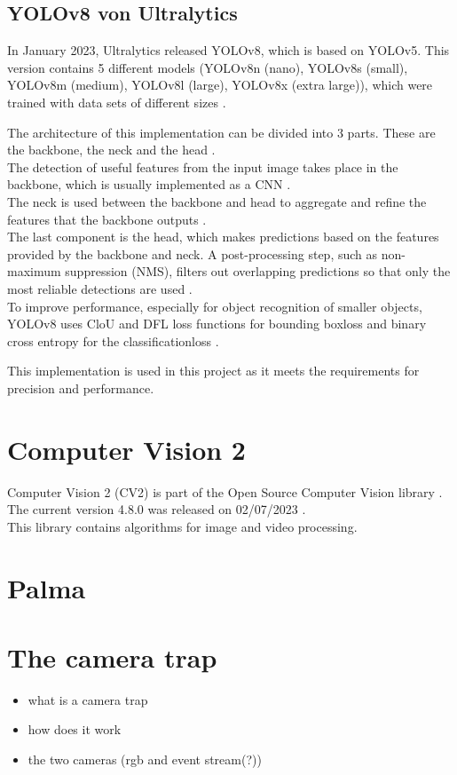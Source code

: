 	\subsection{YOLOv8 von Ultralytics}{ \label{subsec:YOLOv8_theoretic}
	
	In January 2023, Ultralytics released YOLOv8, which is based on YOLOv5. This version contains 5 different models (YOLOv8n (nano), YOLOv8s (small), YOLOv8m (medium), YOLOv8l (large), YOLOv8x (extra large)), which were trained with data sets of different sizes \citep{Terven2023}. 	

	The architecture of this implementation can be divided into 3 parts. These are the backbone, the neck and the head \citep{Terven2023}. \\
	The detection of useful features from the input image takes place in the backbone, which is usually implemented as a CNN \citep{Terven2023}. \\
	The neck is used between the backbone and head to aggregate and refine the features that the backbone outputs \citep{Terven2023}. \\
	The last component is the head, which makes predictions based on the features provided by the backbone and neck. A post-processing step, such as non-maximum suppression (NMS), filters out overlapping predictions so that only the most reliable detections are used \citep{Terven2023}.\\
	To improve performance, especially for object recognition of smaller objects, YOLOv8 uses CloU \citep{Zheng2020} and DFL \citep{Li2020} loss functions for bounding boxloss and binary cross entropy for the classificationloss \citep{Terven2023}. 

	This implementation is used in this project as it meets the requirements for precision and performance. 
	}


\section{Computer Vision 2}
		{ \label{subsec:Computer_Vision_2}
		Computer Vision 2 (CV2) is part of the \glqq Open Source Computer Vision\grqq{} library \citep{opencv_about}. The current version 4.8.0 was released on 02/07/2023 \citep{opencv_release}. \\
		This library contains algorithms for image and video processing. 
		}


\section{Palma}
		

\section{The camera trap}

\begin{itemize}
	\item what is a camera trap
	\item how does it work
	\item the two cameras (rgb and event stream(?))
\end{itemize}
